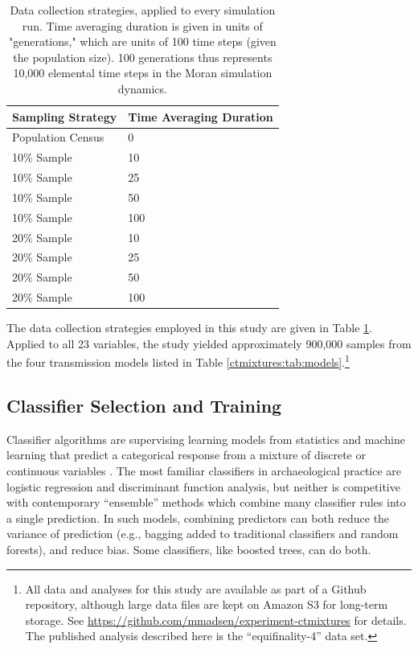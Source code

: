 \begin{table}[ht]
    \begin{tabular}{ll}
        \hline
        Sampling Strategy & Time Averaging Duration \\ 
        \hline
        Population Census & 0 \\
        10\% Sample & 10 \\
        10\% Sample & 25  \\
        10\% Sample & 50 \\
        10\% Sample & 100 \\
        20\% Sample & 10  \\
        20\% Sample & 25 \\
        20\% Sample & 50 \\
        20\% Sample & 100 \\
        \hline
    \end{tabular}
    \caption{Data collection strategies, applied to every simulation run.  Time averaging duration is given in units of "generations," which are units of 100 time steps (given the population size).  100 generations thus represents 10,000 elemental time steps in the Moran simulation dynamics.}
    \label{ctmixtures:tab:measurement-strategies}
\end{table}

The data collection strategies employed in this study are given in Table \ref{ctmixtures:tab:measurement-strategies}.  Applied to all 23 variables, the study yielded approximately 900,000 samples from the four transmission models listed in Table \ref{ctmixtures:tab:models}.\footnote{All data and analyses for this study are available as part of a Github repository, although large data files are kept on Amazon S3 for long-term storage.  See \url{https://github.com/mmadsen/experiment-ctmixtures} for details.  The published analysis described here is the ``equifinality-4'' data set.}  

\subsection{Classifier Selection and
Training}\label{classifier-selection-and-training}

Classifier algorithms are supervising learning models from statistics
and machine learning that predict a categorical response from a mixture
of discrete or continuous variables \citep{hastie2009elements}. The most
familiar classifiers in archaeological practice are logistic regression
and discriminant function analysis, but neither is competitive with
contemporary ``ensemble'' methods which combine many classifier rules
into a single prediction. In such models, combining predictors can both
reduce the variance of prediction (e.g., bagging added to traditional
classifiers and random forests), and
reduce bias.  Some classifiers, like boosted trees, can do both.

